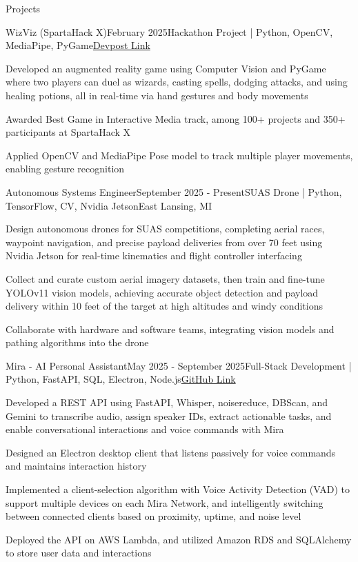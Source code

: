 \documentclass[
	11pt
]{../resume}
\begin{document}
	\begin{rSection}{P}{rojects}
		\begin{rSectionEntry}{WizViz (SpartaHack X)}{February 2025}{Hackathon Project | Python, OpenCV, MediaPipe, PyGame}{\href{https://devpost.com/software/wizviz}{Devpost Link}}
			\item Developed an augmented reality game using Computer Vision and PyGame where two players can duel as wizards, casting spells, dodging attacks, and using healing potions, all in real-time via hand gestures and body movements
			\item Awarded Best Game in Interactive Media track, among 100+ projects and 350+ participants at SpartaHack X
			\item Applied OpenCV and MediaPipe Pose model to track multiple player movements, enabling gesture recognition
		\end{rSectionEntry}

		\begin{rSectionEntry}{Autonomous Systems Engineer}{September 2025 - Present}{SUAS Drone | Python, TensorFlow, CV, Nvidia Jetson}{East Lansing, MI}
			\item Design autonomous drones for SUAS competitions, completing aerial races, waypoint navigation, and precise payload deliveries from over 70 feet using Nvidia Jetson for real-time kinematics and flight controller interfacing
			\item Collect and curate custom aerial imagery datasets, then train and fine-tune YOLOv11 vision models, achieving accurate object detection and payload delivery within 10 feet of the target at high altitudes and windy conditions
			\item Collaborate with hardware and software teams, integrating vision models and pathing algorithms into the drone
		\end{rSectionEntry}

		\begin{rSectionEntry}{Mira - AI Personal Assistant}{May 2025 - September 2025}{Full-Stack Development | Python, FastAPI, SQL, Electron, Node.js}{\href{https://github.com/mira-assistant}{GitHub Link}}
			\item Developed a REST API using FastAPI, Whisper, noisereduce, DBScan, and Gemini to transcribe audio, assign speaker IDs, extract actionable tasks, and enable conversational interactions and voice commands with Mira
			\item Designed an Electron desktop client that listens passively for voice commands and maintains interaction history
			\item Implemented a client-selection algorithm with Voice Activity Detection (VAD) to support multiple devices on each Mira Network, and intelligently switching between connected clients based on proximity, uptime, and noise level
			\item Deployed the API on AWS Lambda, and utilized Amazon RDS and SQLAlchemy to store user data and interactions
		\end{rSectionEntry}
	\end{rSection}
\end{document}
